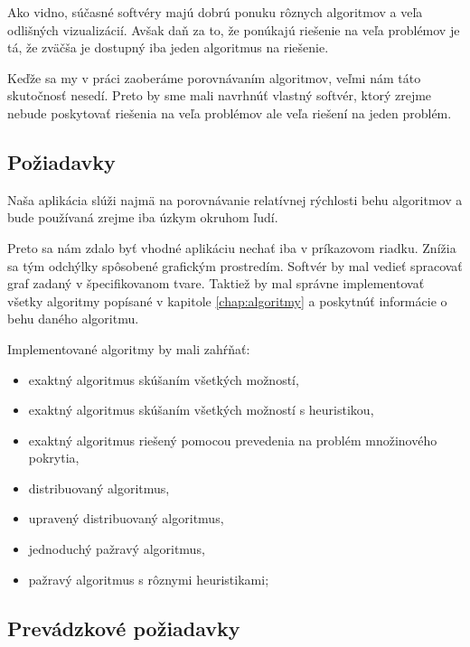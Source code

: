 Ako vidno, súčasné softvéry majú dobrú ponuku rôznych algoritmov a veľa 
odlišných vizualizácií. Avšak daň za to, že ponúkajú riešenie na veľa problémov 
je tá, že zväčša je dostupný iba jeden algoritmus na riešenie.

Keďže sa my v práci zaoberáme porovnávaním algoritmov, veľmi nám táto 
skutočnosť nesedí. Preto by sme mali navrhnúť vlastný softvér, ktorý zrejme 
nebude poskytovať riešenia na veľa problémov ale veľa riešení na jeden problém.


\subsection{Požiadavky}

Naša aplikácia slúži najmä na porovnávanie relatívnej rýchlosti behu algoritmov 
a bude používaná zrejme iba úzkym okruhom ľudí.

Preto sa nám zdalo byť vhodné aplikáciu nechať iba v príkazovom riadku. Znížia 
sa tým odchýlky spôsobené grafickým prostredím. Softvér by mal vedieť spracovať 
graf zadaný v špecifikovanom tvare. Taktiež by mal správne 
implementovať všetky algoritmy popísané v kapitole \ref{chap:algoritmy} a 
poskytnúť informácie o behu daného algoritmu.

Implementované algoritmy by mali zahŕňať:

\begin{itemize}
	\item exaktný algoritmus skúšaním všetkých možností,
	\item exaktný algoritmus skúšaním všetkých možností s heuristikou,
	\item exaktný algoritmus riešený pomocou prevedenia na problém množinového 
		pokrytia,
	\item distribuovaný algoritmus,
	\item upravený distribuovaný algoritmus,
	\item jednoduchý pažravý algoritmus,
	\item pažravý algoritmus s rôznymi heuristikami;
\end{itemize}


\subsection{Prevádzkové požiadavky}

